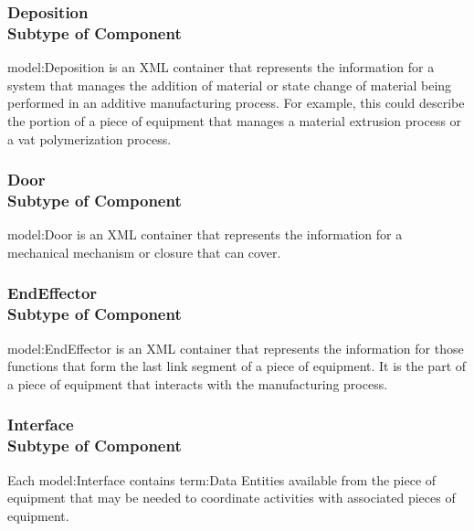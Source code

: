 \FloatBarrier
\subsubsection[Deposition]{Deposition \\ {\small Subtype of Component}}
  \label{type:Deposition}

\FloatBarrier

{model:Deposition} is an XML container that represents the information for a system that manages the addition of material or state change of material being performed in an additive manufacturing process.  For example, this could describe the portion of a piece of equipment that manages a material extrusion process or a vat polymerization process.

\FloatBarrier
\subsubsection[Door]{Door \\ {\small Subtype of Component}}
  \label{type:Door}

\FloatBarrier

{model:Door} is an XML container that represents the information for a mechanical mechanism or closure that can cover.

\FloatBarrier
\subsubsection[EndEffector]{EndEffector \\ {\small Subtype of Component}}
  \label{type:EndEffector}

\FloatBarrier

{model:EndEffector} is an XML container that represents the information for those functions that form the last link segment of a piece of equipment. It is the part of a piece of equipment that interacts with the manufacturing process.

\FloatBarrier
\subsubsection[Interface]{Interface \\ {\small Subtype of Component}}
  \label{type:Interface}

\FloatBarrier

Each {model:Interface} contains {term:Data Entities} available from the piece of equipment that may be needed to coordinate activities with associated pieces of equipment.

